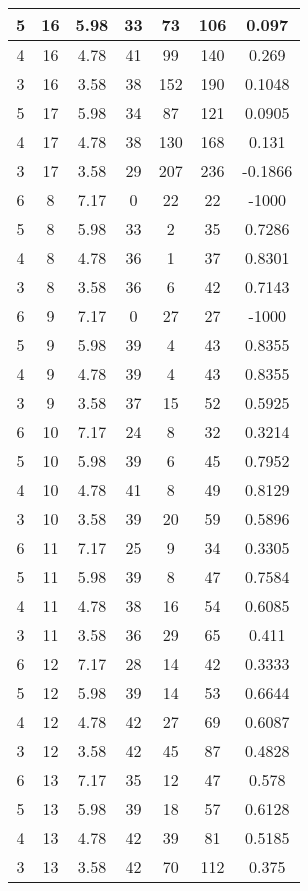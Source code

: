 \documentclass[letterpaper, 12pt]{article}
\begin{document}
\begin{longtable}{|c|c|c|c|c|c|c|}
\hline
5 & 16 & 5.98 & 33 & 73 & 106 & 0.097 \\
\hline
4 & 16 & 4.78 & 41 & 99 & 140 & 0.269 \\
\hline
3 & 16 & 3.58 & 38 & 152 & 190 & 0.1048 \\
\hline
5 & 17 & 5.98 & 34 & 87 & 121 & 0.0905 \\
\hline
4 & 17 & 4.78 & 38 & 130 & 168 & 0.131 \\
\hline
3 & 17 & 3.58 & 29 & 207 & 236 & -0.1866 \\
\hline
6 & 8 & 7.17 & 0 & 22 & 22 & -1000 \\
\hline
5 & 8 & 5.98 & 33 & 2 & 35 & 0.7286 \\
\hline
4 & 8 & 4.78 & 36 & 1 & 37 & 0.8301 \\
\hline
3 & 8 & 3.58 & 36 & 6 & 42 & 0.7143 \\
\hline
6 & 9 & 7.17 & 0 & 27 & 27 & -1000 \\
\hline
5 & 9 & 5.98 & 39 & 4 & 43 & 0.8355 \\
\hline
4 & 9 & 4.78 & 39 & 4 & 43 & 0.8355 \\
\hline
3 & 9 & 3.58 & 37 & 15 & 52 & 0.5925 \\
\hline
6 & 10 & 7.17 & 24 & 8 & 32 & 0.3214 \\
\hline
5 & 10 & 5.98 & 39 & 6 & 45 & 0.7952 \\
\hline
4 & 10 & 4.78 & 41 & 8 & 49 & 0.8129 \\
\hline
3 & 10 & 3.58 & 39 & 20 & 59 & 0.5896 \\
\hline
6 & 11 & 7.17 & 25 & 9 & 34 & 0.3305 \\
\hline
5 & 11 & 5.98 & 39 & 8 & 47 & 0.7584 \\
\hline
4 & 11 & 4.78 & 38 & 16 & 54 & 0.6085 \\
\hline
3 & 11 & 3.58 & 36 & 29 & 65 & 0.411 \\
\hline
6 & 12 & 7.17 & 28 & 14 & 42 & 0.3333 \\
\hline
5 & 12 & 5.98 & 39 & 14 & 53 & 0.6644 \\
\hline
4 & 12 & 4.78 & 42 & 27 & 69 & 0.6087 \\
\hline
3 & 12 & 3.58 & 42 & 45 & 87 & 0.4828 \\
\hline
6 & 13 & 7.17 & 35 & 12 & 47 & 0.578 \\
\hline
5 & 13 & 5.98 & 39 & 18 & 57 & 0.6128 \\
\hline
4 & 13 & 4.78 & 42 & 39 & 81 & 0.5185 \\
\hline
3 & 13 & 3.58 & 42 & 70 & 112 & 0.375 \\

\end{longtable}
\end{document}
